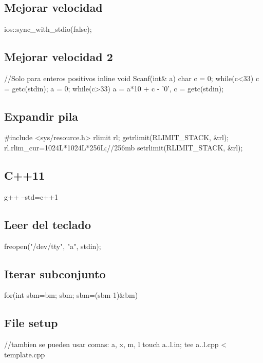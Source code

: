 \subsection*{Mejorar velocidad}
\begin{code}
ios::sync_with_stdio(false);
\end{code}
\subsection*{Mejorar velocidad 2}
\begin{code}
//Solo para enteros positivos
inline void Scanf(int& a){
	char c = 0;
	while(c<33) c = getc(stdin);
	a = 0;
	while(c>33)	a = a*10 + c - '0', c = getc(stdin);
}
\end{code}
\subsection*{Expandir pila}
\begin{code}
#include <sys/resource.h>
rlimit rl;
getrlimit(RLIMIT_STACK, &rl);
rl.rlim_cur=1024L*1024L*256L;//256mb
setrlimit(RLIMIT_STACK, &rl);
\end{code}
\subsection*{C++11}
\begin{code}
g++ --std=c++1
\end{code}
\subsection*{Leer del teclado}
\begin{code}
freopen("/dev/tty", "a", stdin);
\end{code}
\subsection*{Iterar subconjunto}
\begin{code}
for(int sbm=bm; sbm; sbm=(sbm-1)&bm)
\end{code}
\subsection*{File setup}
\begin{code}
//tambien se pueden usar comas: {a, x, m, l}
touch {a..l}.in; tee {a..l}.cpp < template.cpp
\end{code}

